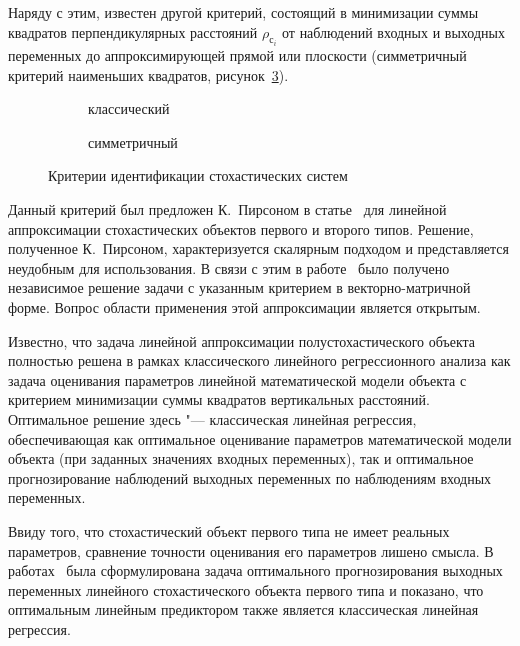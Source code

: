 Наряду с этим, известен другой критерий, состоящий в минимизации суммы квадратов
перпендикулярных расстояний \( \rho_{\text{с}_i} \) от наблюдений входных и выходных переменных до
аппроксимирующей прямой или плоскости (симметричный критерий наименьших квадратов,
рисунок~\ref{fig:state_criteria_symmetric}).

\begin{figure}[h]
  \begin{subfigure}[b]{0.5\linewidth}
    \centering
    \caption{классический}\label{fig:state_criteria_classic}
  \end{subfigure}
  \hfill
  \begin{subfigure}[b]{0.5\linewidth}
    \centering
    \caption{симметричный}\label{fig:state_criteria_symmetric}
  \end{subfigure}

  \vspace{\baselineskip}
  \caption{Критерии идентификации стохастических систем}
\end{figure}

Данный критерий был предложен К.~Пирсоном в статье~\cite{pearson_1901}
для линейной аппроксимации стохастических объектов первого и второго типов.
Решение, полученное К.~Пирсоном, характеризуется скалярным подходом и
представляется неудобным для использования.
В связи с этим в работе~\cite{mukha_2016} было получено независимое решение задачи с
указанным критерием в векторно-матричной форме.
Вопрос области применения этой аппроксимации является открытым.

Известно, что задача линейной аппроксимации полустохастического объекта полностью решена в
рамках классического линейного регрессионного анализа как задача оценивания параметров
линейной математической модели объекта с критерием минимизации суммы квадратов вертикальных расстояний.
Оптимальное решение здесь "--- классическая линейная регрессия,
обеспечивающая как оптимальное оценивание параметров математической модели объекта
(при заданных значениях входных переменных),
так и оптимальное прогнозирование наблюдений выходных переменных по наблюдениям входных переменных.

Ввиду того, что стохастический объект первого типа не имеет реальных параметров,
сравнение точности оценивания его параметров лишено смысла.
В работах~\cite{mukha_2010, mukha_2011} была сформулирована задача оптимального прогнозирования
выходных переменных линейного стохастического объекта первого типа и показано,
что оптимальным линейным предиктором также является классическая линейная регрессия.

